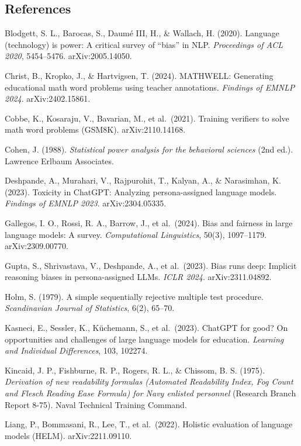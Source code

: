 \documentclass[
]{article}
\begin{document}
\hypertarget{references}{%
\subsection{References}\label{references}}

Blodgett, S. L., Barocas, S., Daumé III, H., \& Wallach, H. (2020).
Language (technology) is power: A critical survey of ``bias'' in NLP.
\emph{Proceedings of ACL 2020}, 5454--5476. arXiv:2005.14050.

Christ, B., Kropko, J., \& Hartvigsen, T. (2024). MATHWELL: Generating
educational math word problems using teacher annotations. \emph{Findings
of EMNLP 2024}. arXiv:2402.15861.

Cobbe, K., Kosaraju, V., Bavarian, M., et al.~(2021). Training verifiers
to solve math word problems (GSM8K). arXiv:2110.14168.

Cohen, J. (1988). \emph{Statistical power analysis for the behavioral
sciences} (2nd ed.). Lawrence Erlbaum Associates.

Deshpande, A., Murahari, V., Rajpurohit, T., Kalyan, A., \& Narasimhan,
K. (2023). Toxicity in ChatGPT: Analyzing persona-assigned language
models. \emph{Findings of EMNLP 2023}. arXiv:2304.05335.

Gallegos, I. O., Rossi, R. A., Barrow, J., et al.~(2024). Bias and
fairness in large language models: A survey. \emph{Computational
Linguistics}, 50(3), 1097--1179. arXiv:2309.00770.

Gupta, S., Shrivastava, V., Deshpande, A., et al.~(2023). Bias runs
deep: Implicit reasoning biases in persona-assigned LLMs. \emph{ICLR
2024}. arXiv:2311.04892.

Holm, S. (1979). A simple sequentially rejective multiple test
procedure. \emph{Scandinavian Journal of Statistics}, 6(2), 65--70.

Kasneci, E., Sessler, K., Küchemann, S., et al.~(2023). ChatGPT for
good? On opportunities and challenges of large language models for
education. \emph{Learning and Individual Differences}, 103, 102274.

Kincaid, J. P., Fishburne, R. P., Rogers, R. L., \& Chissom, B. S.
(1975). \emph{Derivation of new readability formulas (Automated
Readability Index, Fog Count and Flesch Reading Ease Formula) for Navy
enlisted personnel} (Research Branch Report 8-75). Naval Technical
Training Command.

Liang, P., Bommasani, R., Lee, T., et al.~(2022). Holistic evaluation of
language models (HELM). arXiv:2211.09110.
\end{document}
